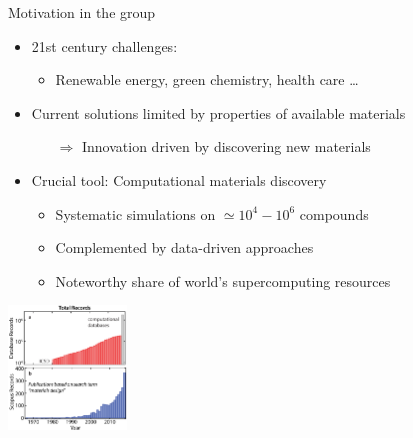 \begin{frame}{Motivation in the \matmat group}
    \begin{itemize}
        \item \alert{21st century challenges}:
            \begin{itemize}
                \vspace{-0.3em}
                \item Renewable energy, green chemistry, health care \ldots
            \end{itemize}
        \vspace{0.2em}
        \item Current solutions limited by properties of available materials
            \begin{itemize}
                \vspace{-0.3em}
                \item[$\Rightarrow$] Innovation driven by \alert{discovering new materials}
            \end{itemize}
        \vspace{0.2em}
        \item Crucial tool: \alert{Computational materials discovery}
            \begin{itemize}
                \vspace{-0.3em}
                \item Systematic simulations on \alert{$\simeq 10^4 - 10^6$ compounds}
                \vspace{-0.3em}
                \item Complemented by data-driven approaches
                \vspace{-0.3em}
                \item \alert{Noteworthy share} of world's supercomputing resources
            \end{itemize}
    \end{itemize}
    \vspace{0.2em}
    \begin{center}
        \includegraphics[height=3.3cm]{img/intro/roadmap-growth.png}

\end{center}
\end{frame}
